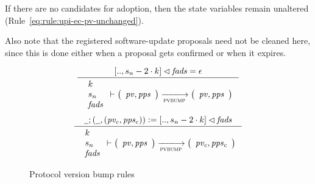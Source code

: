 If there are no candidates for adoption, then the state variables remain
unaltered (Rule~\ref{eq:rule:upi-ec-pv-unchanged}).

Also note that the registered software-update proposals need not be cleaned
here, since this is done either when a proposal gets confirmed or when it
expires.

\begin{figure}[htb]
  \begin{equation}
    \label{eq:rule:pvbump-change-epoch-only}
    \inference
    {
      [.., s_n - 2 \cdot k] \restrictdom \var{fads} = \epsilon
    }
    {
      {\begin{array}{l}
         k\\
         s_n\\
         \var{fads}
       \end{array}}
      \vdash
      {
        \left(
          \begin{array}{l}
            \var{pv}, \var{pps}\\
          \end{array}
        \right)
      }
      \trans{pvbump}{}
      {
        \left(
          \begin{array}{l}
            \var{pv}, \var{pps}\\
          \end{array}
        \right)
      }
    }
  \end{equation}
  \nextdef
  \begin{equation}
    \label{eq:rule:pvbump-change}
    \inference
    {
      \wcard ; (\wcard , (\var{pv_c}, \var{pps_c})) \leteq [.., s_n - 2 \cdot k] \restrictdom \var{fads}
    }
    {
      {\begin{array}{l}
         k\\
         s_n\\
         \var{fads}
       \end{array}}
      \vdash
      {
        \left(
          \begin{array}{l}
            \var{pv}, \var{pps}\\
          \end{array}
        \right)
      }
      \trans{pvbump}{}
      {
        \left(
          \begin{array}{l}
            \var{pv_c}, \var{pps_c}\\
          \end{array}
        \right)
      }
    }
  \end{equation}
  \caption{Protocol version bump rules}
  \label{fig:rules:fads}
\end{figure}

